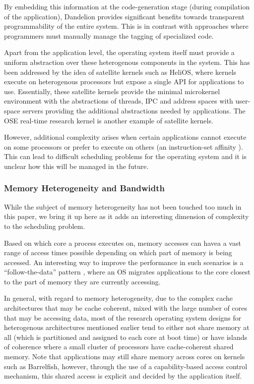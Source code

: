 By embedding this information at the code-generation stage (\ie during compilation of the application), Dandelion provides significant benefits towards transparent programmability of the entire system. This is in contrast with approaches where programmers must manually manage the tagging of specialized code.


Apart from the application level, the operating system itself must provide a uniform abstraction over these heterogenous components in the system. This has been addressed by the idea of satellite kernels such as HeliOS, where kernels execute on heterogenous processors but expose a single API for applications to use. Essentially, these satellite kernels provide the minimal microkernel environment with the abstractions of threads, IPC and address spaces with user-space servers providing the additional abstractions needed by applications. The OSE real-time research kernel \cite{OSE} is another example of satellite kernels.

However, additional complexity arises when certain applications cannot execute on some processors or prefer to execute on others (\ie an instruction-set affinity \cite{Vajda}). This can lead to difficult scheduling problems for the operating system and it is unclear how this will be managed in the future.

\subsubsection{Memory Heterogeneity and Bandwidth}
While the subject of memory heterogeneity has not been touched too much in this paper, we bring it up here as it adds an interesting dimension of complexity to the scheduling problem.

Based on which core a process executes on, memory accesses can havea a vast range of access times possible depending on which part of memory is being accessed. An interesting way to improve the performance in such scenarios is a ``follow-the-data'' pattern \cite{Follow-Pattern}, where an OS migrates applications to the core closest to the part of memory they are currently accessing.

In general, with regard to memory heterogeneity, due to the complex cache architectures that may be cache coherent, mixed with the large number of cores that may be accessing data, most of the research operating system designs for heterogenous architectures mentioned earlier tend to either not share memory at all (which is partitioned and assigned to each core at boot time) or have islands of coherence where a small cluster of processors have cache-coherent shared memory. Note that applications may still share memory across cores on kernels such as Barrelfish, however, through the use of a capability-based access control mechanism, this shared access is explicit and decided by the application itself.

